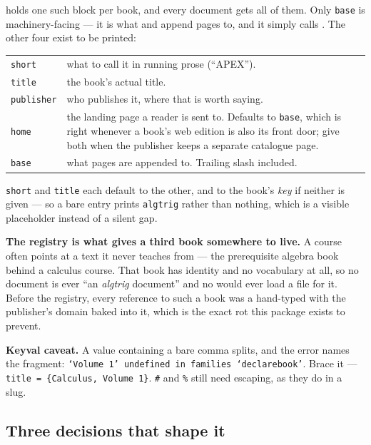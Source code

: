  holds one such block per book,
and every document gets all of them. Only \texttt{base} is
machinery-facing --- it is what  and 
append pages to, and it simply calls . The other four
exist to be printed:

\begin{center}
\begin{tabularx}{\linewidth}{@{}l Y@{}}
\texttt{short} & what to call it in running prose (``APEX'').\\
\texttt{title} & the book's actual title.\\
\texttt{publisher} & who publishes it, where that is worth saying.\\
\texttt{home} & the landing page a reader is sent to. Defaults to
  \texttt{base}, which is right whenever a book's web edition is also its
  front door; give both when the publisher keeps a separate catalogue
  page.\\
\texttt{base} & what pages are appended to. Trailing slash included.\\
\end{tabularx}
\end{center}

\texttt{short} and \texttt{title} each default to the other, and to the
book's \emph{key} if neither is given --- so a bare entry prints
\texttt{algtrig} rather than nothing, which is a visible placeholder
instead of a silent gap.

\textbf{The registry is what gives a third book somewhere to live.} A
course often points at a text it never teaches from --- the prerequisite
algebra book behind a calculus course. That book has identity and no
vocabulary at all, so no document is ever ``an \emph{algtrig}
document'' and no  would ever load a file for it. Before the
registry, every reference to such a book was a hand-typed  with
the publisher's domain baked into it, which is the exact rot this package
exists to prevent.

\textbf{Keyval caveat.} A value containing a bare comma splits, and the
error names the fragment: \texttt{`Volume 1' undefined in families
`declarebook'}. Brace it --- \texttt{title = \{Calculus, Volume 1\}}.
\texttt{\#} and \texttt{\%} still need escaping, as they do in a slug.

\subsection*{Three decisions that shape it}

